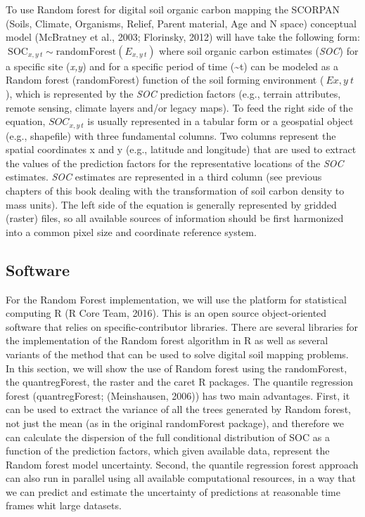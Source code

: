 \documentclass[10pt,b5paper,]{book}
\theoremstyle{definition}
\theoremstyle{definition}
\theoremstyle{definition}
\theoremstyle{remark}
\begin{document}
To use Random forest for digital soil organic carbon mapping the SCORPAN
(Soils, Climate, Organisms, Relief, Parent material, Age and N space)
conceptual model (McBratney et al., 2003; Florinsky, 2012) will have
take the following form:
\(\ \text{SOC}_{x,y~t} \sim \text{randomForest} (E_{x,y~t})\) where soil
organic carbon estimates (\emph{SOC}) for a specific site (\emph{x,y})
and for a specific period of time (\textasciitilde{}t) can be modeled as
a Random forest (randomForest) function of the soil forming environment
(\(\ Ex,y~t\)), which is represented by the \emph{SOC} prediction
factors (e.g., terrain attributes, remote sensing, climate layers and/or
legacy maps). To feed the right side of the equation, \(SOC_{x,y~t}\) is
usually represented in a tabular form or a geospatial object (e.g.,
shapefile) with three fundamental columns. Two columns represent the
spatial coordinates x and y (e.g., latitude and longitude) that are used
to extract the values of the prediction factors for the representative
locations of the \emph{SOC} estimates. \emph{SOC} estimates are
represented in a third column (see previous chapters of this book
dealing with the transformation of soil carbon density to mass units).
The left side of the equation is generally represented by gridded
(raster) files, so all available sources of information should be first
harmonized into a common pixel size and coordinate reference system.

\hypertarget{software}{%
\subsection{Software}\label{software}}

For the Random Forest implementation, we will use the platform for
statistical computing R (R Core Team, 2016). This is an open source
object-oriented software that relies on specific-contributor libraries.
There are several libraries for the implementation of the Random forest
algorithm in R as well as several variants of the method that can be
used to solve digital soil mapping problems. In this section, we will
show the use of Random forest using the randomForest, the
quantregForest, the raster and the caret R packages. The quantile
regression forest (quantregForest; (Meinshausen, 2006)) has two main
advantages. First, it can be used to extract the variance of all the
trees generated by Random forest, not just the mean (as in the original
randomForest package), and therefore we can calculate the dispersion of
the full conditional distribution of SOC as a function of the prediction
factors, which given available data, represent the Random forest model
uncertainty. Second, the quantile regression forest approach can also
run in parallel using all available computational resources, in a way
that we can predict and estimate the uncertainty of predictions at
reasonable time frames whit large datasets.
\end{document}
